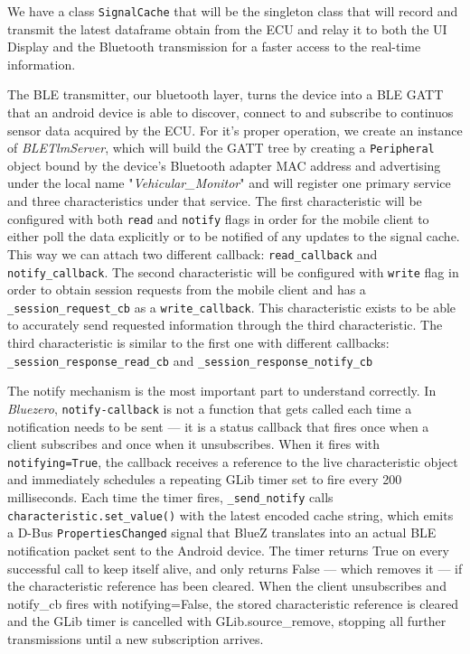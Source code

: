 We have a class \texttt{SignalCache} that will be the singleton class that will record and transmit the latest dataframe obtain from the ECU and relay it to both the UI Display and the Bluetooth transmission for a faster access to the real-time information.

The BLE transmitter, our bluetooth layer, turns the device into a BLE GATT that an android device is able to discover, connect to and subscribe to continuos sensor data acquired by the ECU. For it's proper operation, we create an instance of \textit{BLETlmServer}, which will build the GATT tree by creating a \texttt{Peripheral} object bound by the device's Bluetooth adapter MAC address and advertising under the local name "\textit{Vehicular\_Monitor}" and will register one primary service and three characteristics under that service. The first characteristic will be configured with both \texttt{read} and \texttt{notify} flags in order for the mobile client to either poll the data explicitly or to be notified of any updates to the signal cache. This way we can attach two different callback: \texttt{read\_callback} and \texttt{notify\_callback}. The second characteristic will be configured with \texttt{write} flag in order to obtain session requests from the mobile client and has a \texttt{\_session\_request\_cb} as a \texttt{write\_callback}. This characteristic exists to be able to accurately send requested information through the third characteristic. The third characteristic is similar to the first one with different callbacks: \texttt{\_session\_response\_read\_cb} and \texttt{\_session\_response\_notify\_cb}

The notify mechanism is the most important part to understand correctly. In \textit{Bluezero}, \texttt{notify-callback} is not a function that gets called each time a notification needs to be sent — it is a status callback that fires once when a client subscribes and once when it unsubscribes. When it fires with \texttt{notifying=True}, the callback receives a reference to the live characteristic object and immediately schedules a repeating GLib timer set to fire every 200 milliseconds. Each time the timer fires, \texttt{\_send\_notify} calls \texttt{characteristic.set\_value()} with the latest encoded cache string, which emits a D-Bus \texttt{PropertiesChanged} signal that BlueZ translates into an actual BLE notification packet sent to the Android device. The timer returns True on every successful call to keep itself alive, and only returns False — which removes it — if the characteristic reference has been cleared. When the client unsubscribes and notify\_cb fires with notifying=False, the stored characteristic reference is cleared and the GLib timer is cancelled with GLib.source\_remove, stopping all further transmissions until a new subscription arrives.

